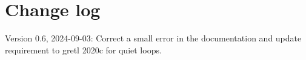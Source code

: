 \documentclass{article}
\begin{document}
\section{Change log}

Version 0.6, 2024-09-03: Correct a small error in the documentation
and update requirement to gretl 2020c for quiet loops.



\end{document}
